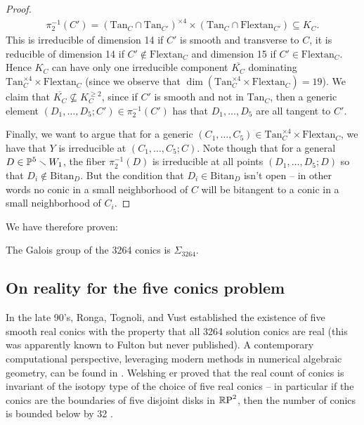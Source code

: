\documentclass[11pt]{amsart}
\providecommand{\Bitan}{\mathrm{Bitan}}
\providecommand{\Flextan}{\mathrm{Flextan}}
\providecommand{\Tan}{\mathrm{Tan}}
\begin{document}
\begin{proof}
\begin{align*}
    \pi_2^{-1}(C') = (\Tan_C \cap \Tan_{C'})^{\times4} \times (\Tan_C \cap \Flextan_{C'}) \subseteq K_C.
\end{align*}
This is irreducible of dimension 14 if $C'$ is smooth and transverse to $C$, it is reducible of dimension 14 if $C' \notin \Flextan_C$ and dimension 15 if $C' \in \Flextan_C$. Hence $K_C$ can have only one irreducible component $\overline{K_C}$ dominating $\Tan_C^{\times 4}\times\Flextan_C$ (since we observe that $\dim (\Tan_C^{\times 4}\times\Flextan_C) =19$). We claim that $\overline{K_C} \not\subseteq K_C^{\ge 2}$, since if $C'$ is smooth and not in $\Tan_C$, then a generic element $(D_1, \ldots, D_5;C') \in \pi_2^{-1}(C')$ has that $D_1, \ldots, D_5$ are all tangent to $C'$.

Finally, we want to argue that for a generic $(C_1, \ldots, C_5) \in \Tan_C^{\times 4}\times\Flextan_C$, we have that $Y$ is irreducible at $(C_1, \ldots, C_5;C)$. Note though that for a general $D\in \mathbb{P}^5\smallsetminus W_1$, the fiber $\pi_2^{-1}(D)$ is irreducible at all points $(D_1, \ldots, D_5;D)$ so that $D_i \notin \Bitan_D$. But the condition that $D_i \in \Bitan_D$ isn't open -- in other words no conic in a small neighborhood of $C$ will be bitangent to a conic in a small neighborhood of $C_i$.
\end{proof}

We have therefore proven:

\begin{theorem} The Galois group of the 3264 conics is $\Sigma_{3264}$.
\end{theorem}


\subsection{On reality for the five conics problem}

In the late 90's, Ronga, Tognoli, and Vust established the existence of five smooth real conics with the property that all 3264 solution conics are real \cite{RongaTognoliVust} (this was apparently known to Fulton but never published). A contemporary computational perspective, leveraging modern methods in numerical algebraic geometry, can be found in \cite{TBS-conics}. Welshing er proved that the real count of conics is invariant of the isotopy type of the choice of five real conics -- in particular if the conics are the boundaries of five disjoint disks in ${\mathbb{R}\text{P}}^2$, then the number of conics is bounded below by 32 \cite[1.7]{Welschinger-GAFA}.
\end{document}
